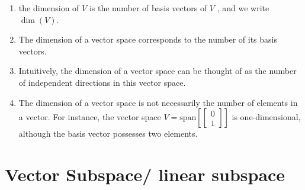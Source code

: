 \begin{enumerate}
    \item the dimension of $V$ is the number of basis vectors of $V$ , and we write $\dim(V)$.
    \hfill \cite{mfml/book/mml/Deisenroth-Faisal-Ong}

    \item The dimension of a vector space corresponds to the number of its basis vectors.
    \hfill \cite{mfml/book/mml/Deisenroth-Faisal-Ong}

    \item Intuitively, the dimension of a vector space can be thought of as the number of independent directions in this vector space.
    \hfill \cite{mfml/book/mml/Deisenroth-Faisal-Ong}

    \item The dimension of a vector space is not necessarily the number of elements in a vector. 
    For instance, the vector space $V = \text{span}[\begin{bmatrix}0 \\ 1\end{bmatrix}]$ is one-dimensional, although the basis vector possesses two elements.
    \hfill \cite{mfml/book/mml/Deisenroth-Faisal-Ong}
\end{enumerate}



\section{Vector Subspace/ linear subspace}


